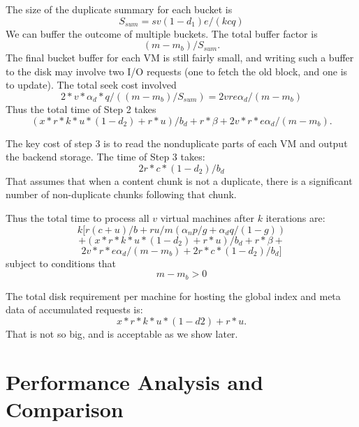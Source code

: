 {The size of  the duplicate summary for each bucket is
\[
S_{sum}= sv(1-d_1)e /(k c q)
\]
We can buffer the outcome of multiple buckets. The total buffer factor is 
\[
(m-m_b)/ S_{sum}.
\]
The final bucket buffer for each VM is still fairly small, and writing such a buffer to the disk may involve two I/O requests (one to fetch the old block, and one is to update). The total seek cost involved 
\[
2*v*\alpha_d*q/ ((m-m_b)/S_{sum})= 2v r e  \alpha_d / (m-m_b)
\]
Thus the total time of Step 2 takes
\[
( x*r *k*u*(1-d_2) + r*u) / b_d  + r* \beta+   2v *r*e \alpha_d /  (m-m_b).
\]


The key cost of step 3  is to read the nonduplicate parts of each VM and output the backend storage. The time of Step 3  takes:
\[
2 r *c* (1-d_2) /b_d
\]
That assumes that when a content chunk is not a duplicate, there is a significant number of non-duplicate  chunks following that  chunk. 

Thus the total time to process all $v$ virtual machines after $k$ iterations are:
\[
k [
r  ( c+  u) /b   +r u /m (\alpha_n  p/g  + \alpha_d q/(1-g)  )
\]
\[
+( x*r *k*u*(1-d_2) + r*u) / b_d  + r* \beta+   
\]
\[
2v *r*e \alpha_d /  (m-m_b)
+2 r *c* (1-d_2) /b_d
]
\]
subject to conditions that
\[
m - m_b> 0
\]

The total disk requirement  per machine for hosting the global index  and meta  data of  accumulated requests is:
\[
x*r *k*u*(1-d2) + r*u.
\]
That is not so big, and is acceptable as we show later.
}



\section{Performance Analysis and Comparison}
\label{sect:analysis}

